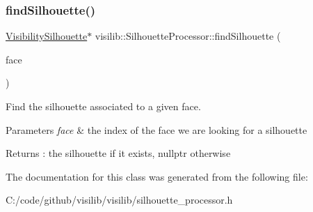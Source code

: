 \subsubsection{\texorpdfstring{findSilhouette()}{findSilhouette()}}
{\footnotesize\ttfamily \mbox{\hyperlink{classvisilib_1_1_visibility_silhouette}{Visibility\+Silhouette}}$\ast$ visilib\+::\+Silhouette\+Processor\+::find\+Silhouette (\begin{DoxyParamCaption}\item[{\mbox{\hyperlink{classvisilib_1_1_silhouette_mesh_face}{Silhouette\+Mesh\+Face}} $\ast$}]{face }\end{DoxyParamCaption})\hspace{0.3cm}{\ttfamily [inline]}}



Find the silhouette associated to a given face. 


\begin{DoxyParams}{Parameters}
{\em face} & the index of the face we are looking for a silhouette \\
\hline
\end{DoxyParams}
\begin{DoxyReturn}{Returns}
\+: the silhouette if it exists, nullptr otherwise 
\end{DoxyReturn}


The documentation for this class was generated from the following file\+:\begin{DoxyCompactItemize}
\item 
C\+:/code/github/visilib/visilib/silhouette\+\_\+processor.\+h\end{DoxyCompactItemize}
